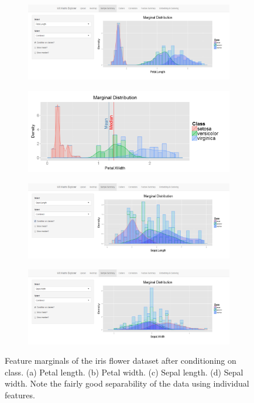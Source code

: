 \documentclass[12pt]{article}
\begin{document}
\begin{figure}
	\centering
	\begin{subfigure}[b]{0.8\textwidth}
		\includegraphics[width=\textwidth]{Figures/Iris/MarginalPetalLength.png}
		\subcaption{}
	\end{subfigure}	
	\begin{subfigure}[b]{0.8\textwidth}
		\includegraphics[width=\textwidth]{Figures/Iris/MarginalPetalWidth.png}
		\subcaption{}
	\end{subfigure}
	\begin{subfigure}[b]{0.8\textwidth}
		\includegraphics[width=\textwidth]{Figures/Iris/MarginalSepalLength.png}
		\subcaption{}
	\end{subfigure}
	\begin{subfigure}[b]{0.8\textwidth}
		\includegraphics[width=\textwidth]{Figures/Iris/MarginalSepalWidth.png}
		\subcaption{}
	\end{subfigure}
	\caption{Feature marginals of the iris flower dataset after conditioning on class. (a) Petal length. (b) Petal width. (c) Sepal length. (d) Sepal width. Note the fairly good separability of the data using individual features.}
	\label{fig:IrisMarginals}
\end{figure}
\end{document}
